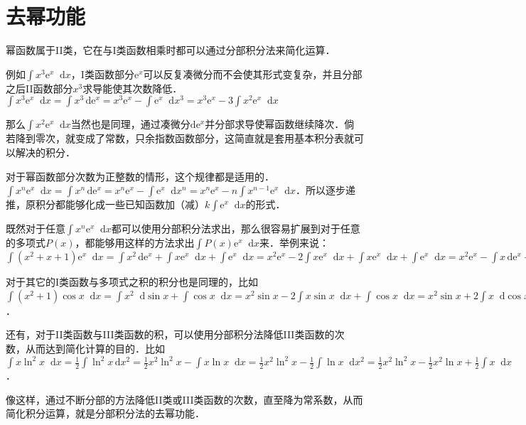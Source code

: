 \documentclass{ctexbook}
\newcommand*{\dif}{\mathop{}\!\mathrm{d}}
\begin{document}
\section{去幂功能}
幂函数属于II类，它在与I类函数相乘时都可以通过分部积分法来简化运算．\par
例如$\int x^{3}\mathrm{e}^{x}\dif{x}$，I类函数部分$\mathrm{e}^{x}$可以反复凑微分而不会使其形式变复杂，并且分部之后II函数部分$x^{3}$求导能使其次数降低．$\int x^{3}\mathrm{e}^{x}\dif{x}=\int x^{3}\,\mathrm{d}\mathrm{e}^{x}=x^{3}\mathrm{e}^{x}-\int\mathrm{e}^{x}\dif{x}^{3}=x^{3}\mathrm{e}^{x}-3\int x^{2}\mathrm{e}^{x}\dif{x}$\par
那么$\int x^{2}\mathrm{e}^{x}\dif{x}$当然也是同理，通过凑微分$\mathrm{d}\mathrm{e}^{x}$并分部求导使幂函数继续降次．倘若降到零次，就变成了常数，只余指数函数部分，这简直就是套用基本积分表就可以解决的积分．\par
对于幂函数部分次数为正整数的情形，这个规律都是适用的．$\int x^{n}\mathrm{e}^{x}\dif{x}=\int x^{n}\,\mathrm{d}\mathrm{e}^{x}=x^{n}\mathrm{e}^{x}-\int\mathrm{e}^{x}\dif{x}^{n}=x^{n}\mathrm{e}^{x}-n\int x^{n-1}\mathrm{e}^{x}\dif{x}$．所以逐步递推，原积分都能够化成一些已知函数加（减）$k\int\mathrm{e}^{x}\dif{x}$的形式．\par
既然对于任意$\int x^{n}\mathrm{e}^{x}\dif{x}$都可以使用分部积分法求出，那么很容易扩展到对于任意的多项式$P\left(x\right)$，都能够用这样的方法求出$\int P\left(x\right)\mathrm{e}^{x}\dif{x}$来．举例来说：\\
$\int\left(x^{2}+x+1\right)\mathrm{e}^{x}\dif{x}=\int x^{2}\,\mathrm{d}\mathrm{e}^{x}+\int x\mathrm{e}^{x}\dif{x}+\int\mathrm{e}^{x}\dif{x}=x^{2}\mathrm{e}^{x}-2\int x\mathrm{e}^{x}\dif{x}+\int x\mathrm{e}^{x}\dif{x}+\int\mathrm{e}^{x}\dif{x}=x^{2}\mathrm{e}^{x}-\int x\,\mathrm{d}\mathrm{e}^{x}+\int\mathrm{e}^{x}\dif{x}=x^{2}\mathrm{e}^{x}-x\mathrm{e}^{x}+\int \mathrm{e}^{x}\dif{x}+\int\mathrm{e}^{x}\dif{x}=x^{2}\mathrm{e}^{x}-x\mathrm{e}^{x}+2\mathrm{e}^{x}+C$\par
对于其它的I类函数与多项式之积的积分也是同理的，比如$\int\left(x^{2}+1\right)\cos{x}\dif{x}=\int x^{2}\dif{\sin{x}}+\int\cos{x}\dif{x}=x^{2}\sin{x}-2\int x\sin{x}\dif{x}+\int\cos{x}\dif{x}=x^{2}\sin{x}+2\int x\dif{\cos{x}}+\int\cos{x}\dif{x}=x^{2}\sin{x}+2x\cos{x}-2\int\cos{x}\dif{x}+\int\cos{x}\dif{x}=2x^{2}\sin{x}+2x\cos{x}-\sin{x}+C$．\par
还有，对于II类函数与III类函数的积，可以使用分部积分法降低III类函数的次数，从而达到简化计算的目的．比如$\int x\ln^{2}{x}\dif{x}=\frac{1}{2}\int\ln^{2}{x}\,\mathrm{d}{x}^{2}=\frac{1}{2}x^{2}\ln^{2}{x}-\int x\ln{x}\dif{x}=\frac{1}{2}x^{2}\ln^{2}{x}-\frac{1}{2}\int\ln{x}\dif{x}^{2}=\frac{1}{2}x^{2}\ln^{2}{x}-\frac{1}{2}x^{2}\ln{x}+\frac{1}{2}\int x\dif{x}$．\par
像这样，通过不断分部的方法降低II类或III类函数的次数，直至降为常系数，从而简化积分运算，就是分部积分法的去幂功能．\par
\end{document}
